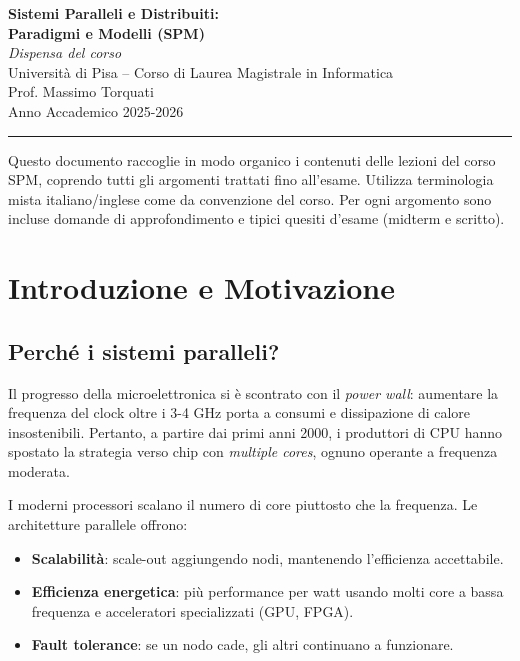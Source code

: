 \documentclass[11pt,a4paper]{article}
\theoremstyle{remark}
\begin{document}
\begin{titlepage}
\centering
\vspace*{2cm}
{\LARGE\bfseries Sistemi Paralleli e Distribuiti:\\[0.5em]
Paradigmi e Modelli (SPM)\\[1em]}
{\large\itshape Dispensa del corso}\\[2em]
{\large Università di Pisa -- Corso di Laurea Magistrale in Informatica}\\[0.5em]
{\large Prof. Massimo Torquati}\\[0.5em]
{\large Anno Accademico 2025-2026}\\[4em]
\hrule\vspace{1em}
\begin{flushleft}\small
Questo documento raccoglie in modo organico i contenuti delle lezioni del corso SPM, coprendo tutti gli argomenti
trattati fino all'esame. Utilizza terminologia mista italiano/inglese come da convenzione del corso.
Per ogni argomento sono incluse domande di approfondimento e tipici quesiti d'esame (midterm e scritto).
\end{flushleft}
\end{titlepage}

\tableofcontents
\newpage

\section{Introduzione e Motivazione}

\subsection{Perché i sistemi paralleli?}

Il progresso della microelettronica si è scontrato con il \emph{power wall}: aumentare la frequenza del clock oltre i 3-4 GHz porta a consumi e dissipazione di calore insostenibili. Pertanto, a partire dai primi anni 2000, i produttori di CPU hanno spostato la strategia verso chip con \emph{multiple cores}, ognuno operante a frequenza moderata.

I moderni processori scalano il numero di core piuttosto che la frequenza. Le architetture parallele offrono:
\begin{itemize}
  \item \textbf{Scalabilità}: scale-out aggiungendo nodi, mantenendo l'efficienza accettabile.
  \item \textbf{Efficienza energetica}: più performance per watt usando molti core a bassa frequenza e acceleratori specializzati (GPU, FPGA).
  \item \textbf{Fault tolerance}: se un nodo cade, gli altri continuano a funzionare.
\end{itemize}
\end{document}
